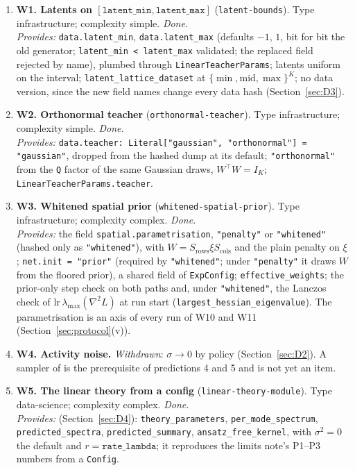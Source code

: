 \documentclass[11pt,a4paper]{article}
\newcommand{\code}[1]{\texttt{#1}}
\begin{document}
\begin{enumerate}[leftmargin=2em,itemsep=5pt]
  \item \textbf{W1. Latents on $[\code{latent\_min}, \code{latent\_max}]$} (\code{latent-bounds}). Type infrastructure; complexity simple. \emph{Done.}\\
  \emph{Provides:} \code{data.latent\_min}, \code{data.latent\_max} (defaults $-1$, $1$, bit for bit the old generator; \code{latent\_min < latent\_max} validated; the replaced field rejected by name), plumbed through \code{LinearTeacherParams}; latents uniform on the interval; \code{latent\_lattice\_dataset} at $\{\min, \mathrm{mid}, \max\}^K$; no data version, since the new field names change every data hash (Section~\ref{sec:D3}).
  \item \textbf{W2. Orthonormal teacher} (\code{orthonormal-teacher}). Type infrastructure; complexity simple. \emph{Done.}\\
  \emph{Provides:} \code{data.teacher: Literal["gaussian", "orthonormal"] = "gaussian"}, dropped from the hashed dump at its default; \code{"orthonormal"} from the \code{Q} factor of the same Gaussian draws, $W^\top W = I_K$; \code{LinearTeacherParams.teacher}.
  \item \textbf{W3. Whitened spatial prior} (\code{whitened-spatial-prior}). Type infrastructure; complexity complex. \emph{Done.}\\
  \emph{Provides:} the field \code{spatial.parametrisation}, \code{"penalty"} or \code{"whitened"} (hashed only as \code{"whitened"}), with $W = S_{\mathrm{rows}}\xi S_{\mathrm{cols}}$ and the plain penalty on $\xi$; \code{net.init = "prior"} (required by \code{"whitened"}; under \code{"penalty"} it draws $W$ from the floored prior), a shared field of \code{ExpConfig}; \code{effective\_weights}; the prior-only step check on both paths and, under \code{"whitened"}, the Lanczos check of $\mathrm{lr}\,\lambda_{\max}(\nabla^2L)$ at run start (\code{largest\_hessian\_eigenvalue}). The parametrisation is an axis of every run of W10 and W11 (Section~\ref{sec:protocol}(v)).
  \item \textbf{W4. Activity noise.} \emph{Withdrawn}: $\sigma\to0$ by policy (Section~\ref{sec:D2}). A sampler of  is the prerequisite of predictions 4 and 5 and is not yet an item.
  \item \textbf{W5. The linear theory from a config} (\code{linear-theory-module}). Type data-science; complexity complex. \emph{Done.}\\
  \emph{Provides:}  (Section~\ref{sec:D4}): \code{theory\_parameters}, \code{per\_mode\_spectrum}, \code{predicted\_spectra}, \code{predicted\_summary}, \code{ansatz\_free\_kernel}, with $\sigma^2 = 0$ the default and $r = \code{rate\_lambda}$; it reproduces the limits note's P1--P3 numbers from a \code{Config}.

\end{enumerate}
\end{document}
